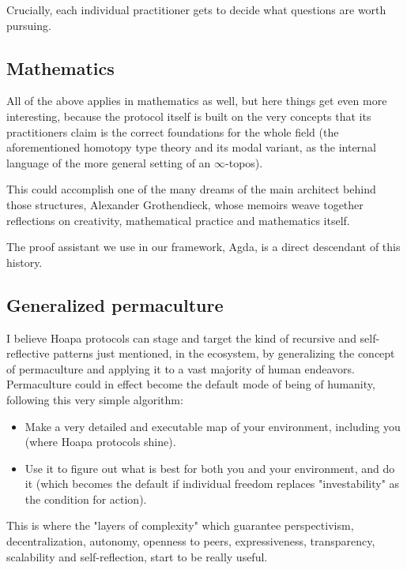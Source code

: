 \documentclass[11pt]{article}
\begin{document}
Crucially, each individual practitioner gets to decide what questions are worth pursuing.

\subsection{Mathematics}

All of the above applies in mathematics as well, but here things get even more interesting, because the protocol itself is built on the very concepts that its practitioners claim is the correct foundations for the whole field (the aforementioned homotopy type theory and its modal variant, as the internal language of the more general setting of an \ensuremath{\infty}-topos).

This could accomplish one of the many dreams of the main architect behind those structures, Alexander Grothendieck, whose memoirs weave together reflections on creativity, mathematical practice and mathematics itself.

The proof assistant we use in our framework, Agda, is a direct descendant of this history.

\subsection{Generalized permaculture}

I believe Hoapa protocols can stage and target the kind of recursive and self-reflective patterns just mentioned, in the ecosystem, by generalizing the concept of permaculture and applying it to a vast majority of human endeavors. Permaculture could in effect become the default mode of being of humanity, following this very simple algorithm:

\begin{itemize}

\item Make a very detailed and executable map of your environment, including you (where Hoapa protocols shine).

\item Use it to figure out what is best for both you and your environment, and do it (which becomes the default if individual freedom replaces "investability" as the condition for action).

\end{itemize}

This is where the "layers of complexity" which guarantee perspectivism, decentralization, autonomy, openness to peers, expressiveness, transparency, scalability and self-reflection, start to be really useful.
\end{document}
